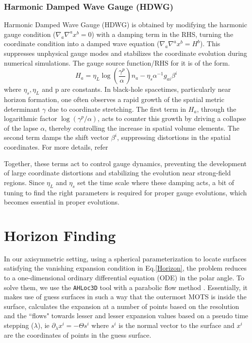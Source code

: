 \subsubsection{Harmonic Damped Wave Gauge (HDWG)}
\label{HDWG}
Harmonic Damped Wave Gauge (HDWG) is obtained by modifying the harmonic gauge condition ($\nabla_a \nabla^a x^b =0$) with a damping term in the RHS, turning the coordinate condition into a damped wave equation ($\nabla_a \nabla^a x^b =H^b$). This suppresses unphysical gauge modes and stabilizes the coordinate evolution during numerical simulations. The gauge source function/RHS for it is of the form.
$$
H_a = \eta_L \log \left( \frac{\gamma^p}{\alpha} \right) n_a - \eta_s \alpha^{-1} g_{ai}\beta^i
$$
where $\eta_s, \eta_L$ and p are constants. In black-hole spacetimes, particularly near horizon formation, one often observes a rapid growth of the spatial metric determinant $\gamma$ due to coordinate stretching. The first term in $H_a$, through the logarithmic factor $\log(\gamma^p / \alpha)$, acts to counter this growth by driving a collapse of the lapse $\alpha$, thereby controlling the increase in spatial volume elements. The second term damps the shift vector $\beta^i$, suppressing distortions in the spatial coordinates. For more details, refer \cite{lindblom_szilágyi_2009}

Together, these terms act to control gauge dynamics, preventing the development of large coordinate distortions and stabilizing the evolution near strong-field regions. Since $\eta_L$ and $\eta_s$ set the time scale where these damping acts, a bit of tuning to find the right parameters is required for proper gauge evolutions, which becomes essential in proper evolutions.

\section{Horizon Finding}
\label{horizon}
In our axisymmetric setting, using a spherical parameterization to locate surfaces satisfying the vanishing expansion condition in Eq.\ref{Horizon}, the problem reduces to a one-dimensional ordinary differential equation (ODE) in the polar angle. To solve them, we use the \texttt{AHLoc3D} tool with a parabolic flow method \cite{thornburg_2007}. Essentially, it makes use of guess surfaces in such a way that the outermost MOTS is inside the surface, calculates the expansion at a number of points based on the resolution and the ``flows" towards lesser and lesser expansion values based on a pseudo time stepping ($\lambda$), ie
$
\partial_\lambda x^i = - \Theta s^i
$
where $s^i$ is the normal vector to the surface and $x^i$ are the coordinates of points in the guess surface.

